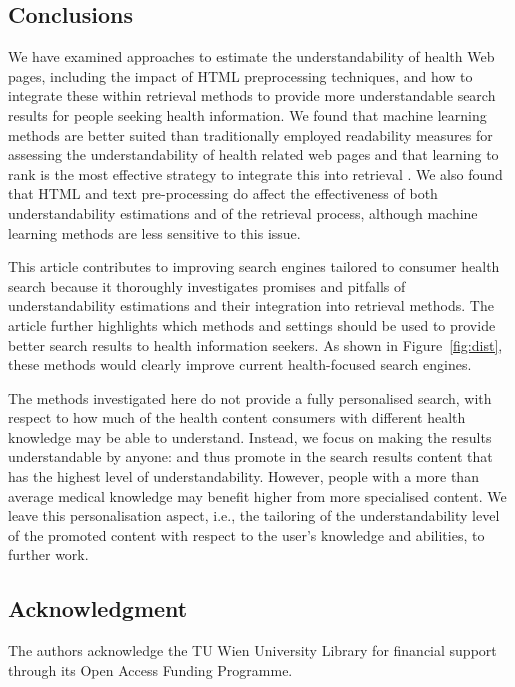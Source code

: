 \documentclass[10pt,a4paper]{article}
\begin{document}
\subsection*{Conclusions}

We have examined approaches to estimate the understandability of health Web pages, including the impact of HTML preprocessing techniques, and how to integrate these within retrieval methods to provide more understandable search results for people seeking health information. We found that machine learning methods are better suited than traditionally employed readability measures for assessing the understandability of health related web pages and that learning to rank is the most effective strategy to integrate this into retrieval . We also found that HTML and text pre-processing do affect the effectiveness of both understandability estimations and of the retrieval process, although machine learning methods are less sensitive to this issue.

This article contributes to improving search engines tailored to consumer health search because it thoroughly investigates promises and pitfalls of understandability estimations and their integration into retrieval methods. The article further highlights which methods and settings should be used to provide better search results to health information seekers. As shown in Figure~\ref{fig:dist}, these methods would clearly improve current health-focused search engines. 

The methods investigated here do not provide a fully personalised search, with respect to how much of the health content consumers with different health knowledge may be able to understand. Instead, we focus on making the results understandable by anyone: and thus promote in the search results content that has the highest level of understandability. However, people with a more than average medical knowledge may benefit higher from more specialised content. We leave this personalisation aspect, i.e., the tailoring of the understandability level of the promoted content with respect to the user's knowledge and abilities, to further work.

\subsection*{Acknowledgment}
The authors acknowledge the TU Wien University Library for financial support through its Open Access Funding Programme.
\end{document}
